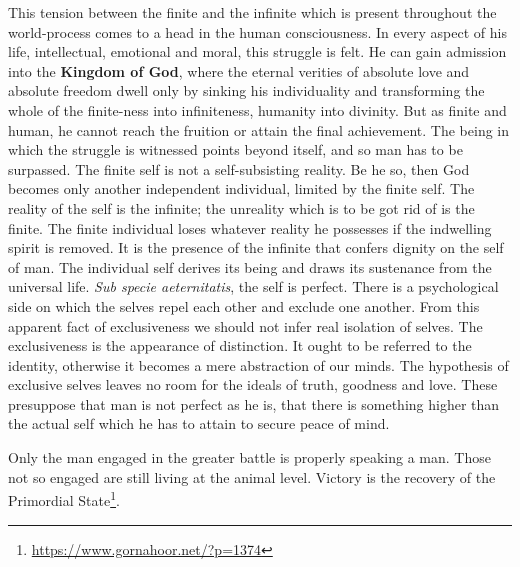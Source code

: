 \begin{quotex}
This tension between the finite and the infinite which is present throughout the world-process comes to a head in the human consciousness. In every aspect of his life, intellectual, emotional and moral, this struggle is felt. He can gain admission into the \textbf{Kingdom of God}, where the eternal verities of absolute love and absolute freedom dwell only by sinking his individuality and transforming the whole of the finite-ness into infiniteness, humanity into divinity. But as finite and human, he cannot reach the fruition or attain the final achievement. The being in which the struggle is witnessed points beyond itself, and so man has to be surpassed. The finite self is not a self-subsisting reality. Be he so, then God becomes only another independent individual, limited by the finite self. The reality of the self is the infinite; the unreality which is to be got rid of is the finite. The finite individual loses whatever reality he possesses if the indwelling spirit is removed. It is the presence of the infinite that confers dignity on the self of man. The individual self derives its being and draws its sustenance from the universal life. \emph{Sub specie aeternitatis}, the self is perfect. There is a psychological side on which the selves repel each other and exclude one another. From this apparent fact of exclusiveness we should not infer real isolation of selves. The exclusiveness is the appearance of distinction. It ought to be referred to the identity, otherwise it becomes a mere abstraction of our minds. The hypothesis of exclusive selves leaves no room for the ideals of truth, goodness and love. These presuppose that man is not perfect as he is, that there is something higher than the actual self which he has to attain to secure peace of mind.
\end{quotex}


Only the man engaged in the greater battle is properly speaking a man. Those not so engaged are still living at the animal level. Victory is the recovery of the Primordial State\footnote{\url{https://www.gornahoor.net/?p=1374}}.

